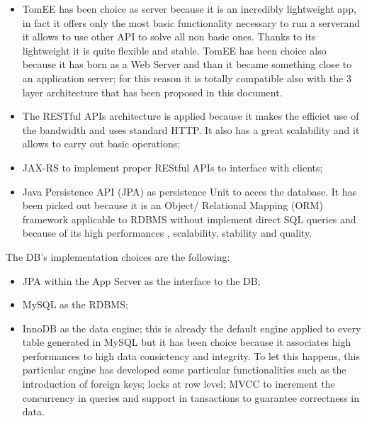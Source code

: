 \begin{itemize}
	\item TomEE has been choice as server because it is an incredibly lightweight app, in fact it offers only the most basic 				functionality necessary to run a serverand it allows to use other API to solve all non basic ones. Thanks to its lightweight it is 			quite flexible and stable. TomEE has been choice also because it has born as a Web Server and than it became something close to 		an application server; for this reason it is totally compatible also with the 3 layer architecture that has been proposed in this 			document.
	\item The RESTful APIs architecture is applied because it makes the efficiet use of the bandwidth and uses standard HTTP. It 			also has a great scalability and it allows to carry out basic operations;
	\item JAX-RS to implement proper REStful APIs to interface with clients;
	\item Java Persistence API (JPA) as persistence Unit to acces the database. It has been picked out because it is an Object/			Relational Mapping (ORM) framework applicable to RDBMS without implement direct SQL queries and because of its high 				performances , scalability, stability and quality.
\end{itemize}
The DB's implementation choices are the following:
\begin{itemize}
	\item JPA within the App Server as the interface to the DB;
	\item MySQL as the RDBMS;
	\item InnoDB as the data engine; this is already the default engine applied to every table generated in MySQL but it has been 			choice because it associates high performances to high data consictency and integrity. To let this happens, this particular 			engine has developed some particular functionalities such as the introduction of foreign keys; locks at row level; MVCC to 			increment the concurrency in queries and support in tansactions to guarantee correctness in data.
\end{itemize}

